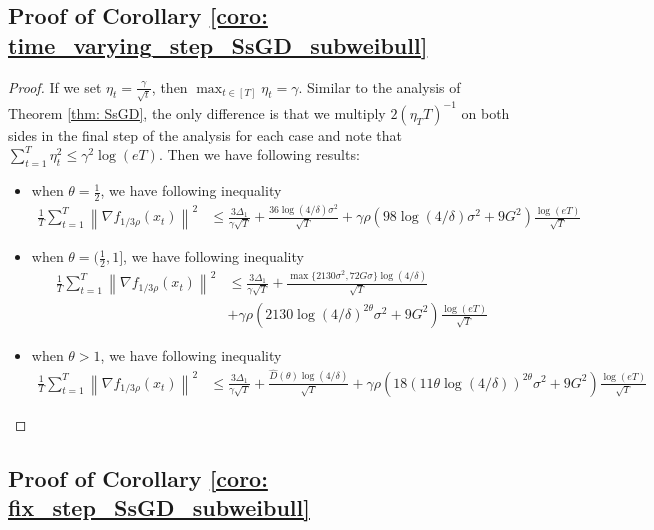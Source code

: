 \documentclass{article}
\def \sumT {\sum_{t=1}^T}
\def \nab {\nabla}
\newcommand{\norm}[2][]{\left\|#2\right\|^{#1}}
\begin{document}
\subsection{Proof of Corollary \ref{coro: time_varying_step_SsGD_subweibull}}

\begin{proof}
    If we set $\eta_t = \frac{\gamma}{\sqrt{t}}$, then $\max_{t\in[T]}\eta_t = \gamma$. Similar to the analysis of Theorem \ref{thm: SsGD}, the only difference is that we multiply $2(\eta_T T)^{-1}$ on both sides in the final step of the analysis for each case and note that $\sumT\eta_t^2\leq\gamma^2\log(eT)$. Then we have following results:
    \begin{itemize}
        \item when $\theta=\frac{1}{2}$, we have following inequality
        \begin{align}
            \frac{1}{T}\sumT \norm[2]{\nab f_{1/3\rho}(x_t)} &\leq \frac{3\Delta_1}{\gamma\sqrt{T}} + \frac{36\log(4/\delta)\sigma^2}{\sqrt{T}}+ \gamma\rho(98\log(4/\delta)\sigma^2+9G^2)\frac{\log(eT)}{\sqrt{T}}
        \end{align}
        \item when $\theta=(\frac{1}{2},1]$, we have following inequality
        \begin{align}
            \frac{1}{T}\sumT \norm[2]{\nab f_{1/3\rho}(x_t)}&\leq \frac{3\Delta_1}{\gamma\sqrt{T}} + \frac{\max\{2130\sigma^2,72G\sigma\}\log(4/\delta)}{\sqrt{T}}\nonumber\\
            &+ \gamma\rho(2130\log(4/\delta)^{2\theta}\sigma^2+9G^2)\frac{\log(eT)}{\sqrt{T}}
        \end{align}
        \item when $\theta>1$, we have following inequality 
        \begin{align}
            \frac{1}{T}\sumT \norm[2]{\nab f_{1/3\rho}(x_t)}&\leq \frac{3\Delta_1}{\gamma\sqrt{T}} + \frac{\widehat{D}(\theta)\log(4/\delta)}{\sqrt{T}}+ \gamma\rho(18(11\theta\log(4/\delta))^{2\theta}\sigma^2+9G^2)\frac{\log(eT)}{\sqrt{T}}
        \end{align}
    \end{itemize}
\end{proof}

\subsection{Proof of Corollary \ref{coro: fix_step_SsGD_subweibull}}
\end{document}
